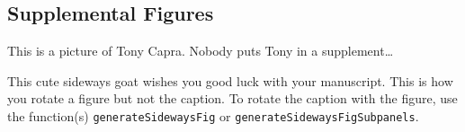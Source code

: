 \subsection*{Supplemental Figures}
\setcounter{figure}{0} %
\renewcommand{\thefigure}{S\arabic{figure}} %



    {This is a picture of Tony Capra.} %
    {Nobody puts Tony in a supplement\dots} %
\tony


    {This cute sideways goat wishes you good luck with your manuscript.} %
    {This is how you rotate a figure but not the caption. To rotate the caption with the figure, use the function(s) \texttt{generateSidewaysFig} or \texttt{generateSidewaysFigSubpanels}.} %
\cutegoat

\clearpage

